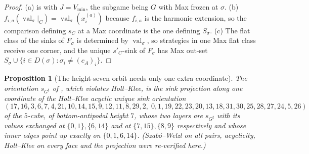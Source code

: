 \documentclass[11pt]{article}
\theoremstyle{plain}
\newtheorem{proposition}[theorem]{Proposition}
\theoremstyle{definition}
\DeclareMathOperator{\val}{val}
\newcommand{\Vmin}{V_{\min}}
\begin{document}
\begin{proof}
(a) is  with $J=\Vmin$, the subgame being $G$
with Max frozen at $\sigma$. (b) $f_{i,a}(\val_\sigma|_C)=\val_\sigma(x_i^{(a)})$
because $f_{i,a}$ is the harmonic extension, so the comparison defining
$s_C$ at a Max coordinate is the one defining $S_\sigma$. (c) The flat
class of the sinks of $F_\sigma$ is determined by $\val_\sigma$, so
strategies in one Max flat class receive one corner, and the unique
$s'_C$-sink of $F_\sigma$ has Max out-set
$S_\sigma\cup\{i\in D(\sigma):\sigma_i\ne(c_A)_i\}$.
\end{proof}

\begin{proposition}[The height-seven orbit needs only one extra coordinate]\label{prop:seven-k1}
The orientation $s_{G^{\sharp}}$ of , which violates
Holt--Klee, is the sink projection along one coordinate of the Holt--Klee
acyclic unique sink orientation
\[
  (17,16,3,6,7,4,21,10,14,15,9,12,11,8,29,2,\;0,1,19,22,23,20,13,18,31,30,25,28,27,24,5,26)
\]
of the $5$-cube, of bottom-antipodal height $7$, whose two layers are
$s_{G^{\sharp}}$ with its values exchanged at $\{0,1\},\{6,14\}$ and at
$\{7,15\},\{8,9\}$ respectively and whose inner edges point up exactly
on $\{0,1,6,14\}$. (Szab\'o--Welzl on all pairs, acyclicity, Holt--Klee on
every face and the projection were re-verified here.)
\end{proposition}
\end{document}
